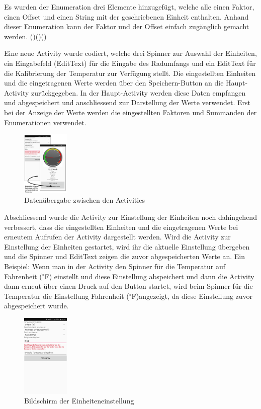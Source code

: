 Es wurden der Enumeration drei Elemente hinzugefügt, welche alle einen Faktor, einen Offset und einen String mit der geschriebenen Einheit enthalten. Anhand dieser Enumeration kann der Faktor und der Offset einfach zugänglich gemacht werden. (\cite{calcTemp})(\cite{calcPressure})(\cite{calcVelocity}) 

Eine neue Activity wurde codiert, welche drei Spinner zur Auswahl der Einheiten, ein Eingabefeld (EditText) für die Eingabe des Radumfangs und ein EditText für die Kalibrierung der Temperatur zur Verfügung stellt. Die eingestellten Einheiten und die eingetragenen Werte werden über den Speichern-Button an die Haupt-Activity zurückgegeben. In der Haupt-Activity werden diese Daten empfangen und abgespeichert und anschliessend zur Darstellung der Werte verwendet. Erst bei der Anzeige der Werte werden die eingestellten Faktoren und Summanden der Enumerationen verwendet.

\begin{figure}[ht]
    \includegraphics[width=0.2\textwidth]{3Vorgehen/imag/onActivityResult.PNG}
    \caption{Datenübergabe zwischen den Activities}
	\label{onActivityResult} 
\end{figure}

Abschliessend wurde die Activity zur Einstellung der Einheiten noch dahingehend verbessert, dass die eingestellten Einheiten und die eingetragenen Werte bei erneutem Aufrufen der Activity dargestellt werden. Wird die Activity zur Einstellung der Einheiten gestartet, wird ihr die aktuelle Einstellung übergeben und die Spinner und EditText zeigen die zuvor abgespeicherten Werte an. Ein Beispiel: Wenn man in der Activity den Spinner für die Temperatur auf \glqq Fahrenheit ($^\circ$F) \grqq einstellt und diese Einstellung abspeichert und dann die Activity dann erneut über einen Druck auf den Button startet, wird beim Spinner für die Temperatur die Einstellung \glqq Fahrenheit ($^\circ$F)\grqq angezeigt, da diese Einstellung zuvor abgespeichert wurde.

\begin{figure}[ht]
    \includegraphics[width=0.2\textwidth]{3Vorgehen/imag/BLEEinheitenUndEinstellungenStart.png}
    \caption{Bildschirm der Einheiteneinstellung}
	\label{BLEEinheitenUndEinstellungenStart} 
\end{figure}

